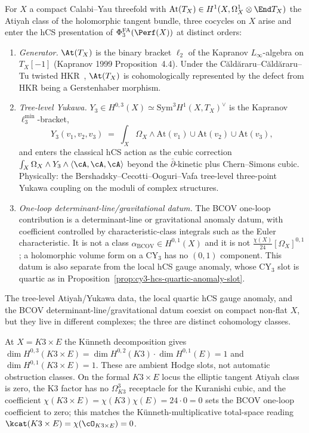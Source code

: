 \begin{theorem}
\label{thm:three-atiyah-cocycles-qca}
For $X$ a compact Calabi--Yau threefold with $\mathrm{At}(T_X) \in H^1(X, \Omega^1_X \otimes \End T_X)$ the Atiyah class of the holomorphic tangent bundle, three cocycles on $X$ arise and enter the hCS presentation of $\PhiFA_3(\Perf(X))$ at distinct orders:
\begin{enumerate}
\item \emph{Generator.} $\At(T_X)$ is the binary bracket $\ell_2$ of the Kapranov $L_\infty$-algebra on $T_X[-1]$ (Kapranov 1999 Proposition~4.4). Under the C\u ald\u araru--C\u ald\u araru--Tu twisted HKR~\cite{CaldararuCaldararuTu2014}, $\At(T_X)$ is cohomologically represented by the defect from HKR being a Gerstenhaber morphism.
\item \emph{Tree-level Yukawa.} $Y_3 \in H^{0,3}(X) \simeq \mathrm{Sym}^3 H^1(X, T_X)^\vee$ is the Kapranov $\ell_3^{\min}$-bracket,
\[
Y_3(v_1, v_2, v_3) \;=\; \int_X \Omega_X \wedge \mathrm{At}(v_1) \cup \mathrm{At}(v_2) \cup \mathrm{At}(v_3),
\]
and enters the classical hCS action as the cubic correction $\int_X \Omega_X \wedge Y_3 \wedge \langle \cA, \cA, \cA \rangle$ beyond the $\bar\partial$-kinetic plus Chern--Simons cubic. Physically: the Bershadsky--Cecotti--Ooguri--Vafa tree-level three-point Yukawa coupling on the moduli of complex structures.
\item \emph{One-loop determinant-line/gravitational datum.} The BCOV
one-loop contribution is a determinant-line or gravitational anomaly
datum, with coefficient controlled by characteristic-class integrals
such as the Euler characteristic. It is not a class
$\alpha_{\mathrm{BCOV}}\in H^{0,1}(X)$ and it is not
$\frac{\chi(X)}{24}[\Omega_X]^{0,1}$; a holomorphic volume form on a
CY$_3$ has no $(0,1)$ component. This datum is also separate from the
local hCS gauge anomaly, whose CY$_3$ slot is quartic as in
Proposition~\ref{prop:cy3-hcs-quartic-anomaly-slot}.
\end{enumerate}
The tree-level Atiyah/Yukawa data, the local quartic hCS gauge anomaly,
and the BCOV determinant-line/gravitational datum coexist on compact
non-flat $X$, but they live in different complexes; the three are
distinct cohomology classes.
\end{theorem}

\begin{remark}[Geometry at \texorpdfstring{$X = K3 \times E$}{X = K3 x E}]
\label{rem:three-cocycles-at-K3xE-qca}
At $X = K3 \times E$ the K\"unneth decomposition gives
$\dim H^{0,3}(K3 \times E) = \dim H^{0,2}(K3) \cdot \dim H^{0,1}(E) = 1$
and $\dim H^{0,1}(K3 \times E) = 1$. These are ambient Hodge slots,
not automatic obstruction classes. On the formal $K3\times E$ locus the
elliptic tangent Atiyah class is zero, the K3 factor has no
$\Omega^3_{K3}$ receptacle for the Kuranishi cubic, and the coefficient
$\chi(K3 \times E)=\chi(K3)\chi(E)=24\cdot0=0$ sets the BCOV one-loop
coefficient to zero; this matches the K\"unneth-multiplicative
total-space reading $\kcat(K3 \times E)=\chi(\cO_{K3\times E})=0$.
\end{remark}

